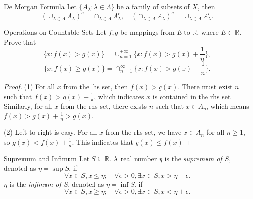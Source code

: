 \begin{theorem}{De Morgan Formula}{}
  Let $\{A_{\lambda}: \lambda \in \Lambda\}$ be a family of subsets of $X$, then
  \begin{equation}
    \left(\cup_{\lambda\in\Lambda}A_{\lambda}\right)^{c}=\cap_{\lambda\in\Lambda}A_{\lambda}^{c},\quad\left(\cap_{\lambda\in\Lambda}A_{\lambda}\right)^{c}=\cup_{\lambda\in\Lambda}A_{\lambda}^{c}.
  \end{equation}
\end{theorem}

\begin{example}{Operations on Countable Sets}{}
  Let $f, g$ be mappings from $E$ to $\mathbb{R}$, where $E \subset \mathbb{R}$.
  Prove that
  \begin{equation}
    \{x: f(x) > g(x) \} = \cup _{n=1}^{+\infty} \{x: f(x) > g(x) + \frac{1}{n}\},
  \end{equation}
  \begin{equation}
    \{x: f(x) \geq g(x)\} = \cap _{n = 1}^{\infty} \{x: f(x) > g(x) - \frac{1}{n}\}.
  \end{equation}
\end{example}

\begin{proof}
  (1) For all $x$ from the lhs set,
  then $f(x) > g(x)$. There must exist $n$ such that $f(x) > g(x) + \frac{1}{n}$,
  which indicates $x$ is contained in the rhs set.
  Similarly, for all $x$ from the rhs set, there exists $n$ such that $x \in A_n$,
  which means $f(x) > g(x) + \frac{1}{n} > g(x)$.

  (2) Left-to-right is easy. For all $x$ from the rhs set,
  we have $x \in A_n$ for all $n \geq 1$, so $g(x) < f(x) + \frac{1}{n}$.
  This indicates that $g(x) \leq f(x)$.
\end{proof}

\begin{definition}{Supremum and Infimum}{}
  Let $S \subseteq \mathbb{R}$. A real number $\eta$ is the \emph{supremum of $S$},
  denoted as $\eta = \sup S$, if
  \begin{equation}
    \forall x \in S, x \leq \eta; \quad
    \forall \epsilon > 0, \exists x \in S, x > \eta - \epsilon.
  \end{equation}
  $\eta$ is the \emph{infimum of $S$}, denoted as $\eta = \inf S$, if
  \begin{equation}
    \forall x \in S, x \geq \eta; \quad
    \forall \epsilon > 0, \exists x \in S, x < \eta + \epsilon.
  \end{equation}
\end{definition}

